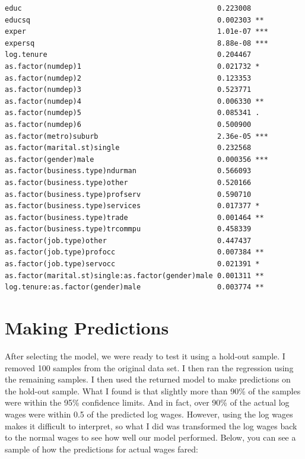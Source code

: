\documentclass[12pt,a4paper,twoside]{article}
\begin{document}
\begin{verbatim}
educ                                              0.223008    
educsq                                            0.002303 ** 
exper                                             1.01e-07 ***
expersq                                           8.88e-08 ***
log.tenure                                        0.204467    
as.factor(numdep)1                                0.021732 *  
as.factor(numdep)2                                0.123353    
as.factor(numdep)3                                0.523771    
as.factor(numdep)4                                0.006330 ** 
as.factor(numdep)5                                0.085341 .  
as.factor(numdep)6                                0.500900    
as.factor(metro)suburb                            2.36e-05 ***
as.factor(marital.st)single                       0.232568    
as.factor(gender)male                             0.000356 ***
as.factor(business.type)ndurman                   0.566093    
as.factor(business.type)other                     0.520166    
as.factor(business.type)profserv                  0.590710    
as.factor(business.type)services                  0.017377 *  
as.factor(business.type)trade                     0.001464 ** 
as.factor(business.type)trcommpu                  0.458339    
as.factor(job.type)other                          0.447437    
as.factor(job.type)profocc                        0.007384 ** 
as.factor(job.type)servocc                        0.021391 *  
as.factor(marital.st)single:as.factor(gender)male 0.001311 ** 
log.tenure:as.factor(gender)male                  0.003774 ** 
\end{verbatim}

\section{Making Predictions} 
After selecting the model, we were ready to test it using a hold-out sample. I removed 100 samples from the original data set. I then ran the regression using the remaining samples. I then used the returned model to make predictions on the hold-out sample. What I found is that slightly more than 90\% of the samples were within the 95\% confidence limits. And in fact, over 90\% of the actual log wages were within 0.5 of the predicted log wages. However, using the log wages makes it difficult to interpret, so what I did was transformed the log wages back to the normal wages to see how well our model performed. Below, you can see a sample of how the predictions for actual wages fared:
\end{document}
